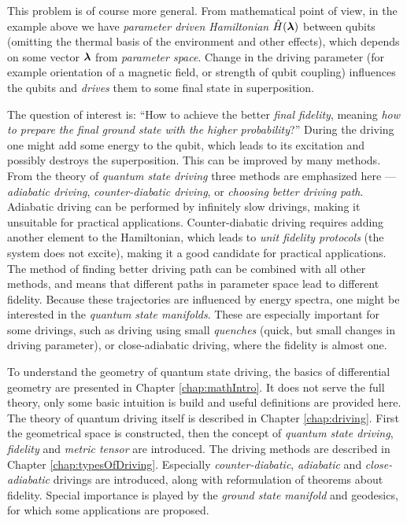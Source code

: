 This problem is of course more general. From mathematical point of view, in the example above we have \emph{parameter driven Hamiltonian} $\hat{H}({\bm\lambda})$ between qubits (omitting the thermal basis of the environment and other effects), which depends on some vector ${\bm\lambda}$ from \emph{parameter space}. Change in the driving parameter (for example orientation of a magnetic field, or strength of qubit coupling) influences the qubits and \emph{drives} them to some final state in superposition.

The question of interest is: “How to achieve the better \emph{final fidelity}, meaning \emph{how to prepare the final ground state with the higher probability}?” During the driving one might add some energy to the qubit, which leads to its excitation and possibly destroys the superposition. This can be improved by many methods. From the theory of \emph{quantum state driving} three methods are emphasized here — \emph{adiabatic driving}, \emph{counter-diabatic driving}, or \emph{choosing better driving path}. Adiabatic driving can be performed by infinitely slow drivings, making it unsuitable for practical applications. Counter-diabatic driving requires adding another element to the Hamiltonian, which leads to \emph{unit fidelity protocols} (the system does not excite), making it a good candidate for practical applications. The method of finding better driving path can be combined with all other methods, and means that different paths in parameter space lead to different fidelity. Because these trajectories are influenced by energy spectra, one might be interested in the \emph{quantum state manifolds}. These are especially important for some drivings, such as driving using small \emph{quenches} (quick, but small changes in driving parameter), or close-adiabatic driving, where the fidelity is almost one.

To understand the geometry of quantum state driving, the basics of differential geometry are presented in Chapter \ref{chap:mathIntro}. It does not serve the full theory, only some basic intuition is build and useful definitions are provided here. The theory of quantum driving itself is described in Chapter \ref{chap:driving}. First the geometrical space is constructed, then the concept of \emph{quantum state driving}, \emph{fidelity} and \emph{metric tensor} are introduced.
The driving methods are described in Chapter \ref{chap:typesOfDriving}. Especially \emph{counter-diabatic}, \emph{adiabatic} and \emph{close-adiabatic} drivings are introduced, along with reformulation of theorems about fidelity. Special importance is played by the \emph{ground state manifold} and geodesics, for which some applications are proposed.

